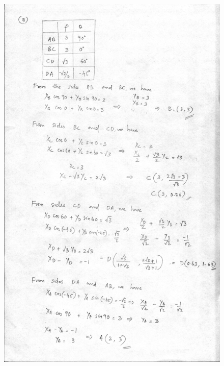 \documentclass{article}
\begin{document}
\begin{figure}
\includegraphics[width=15cm]{qn5_1.jpg}
\end{figure}
\end{document}

